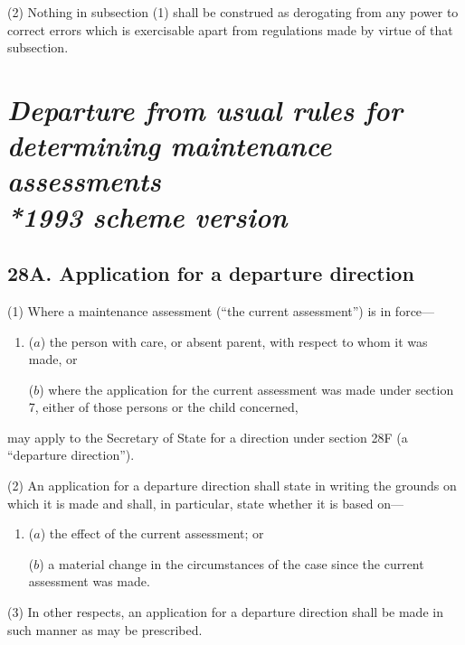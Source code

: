 \documentclass[12pt,a4paper]{article}
\begin{document}
(2) Nothing in subsection (1) shall be construed as derogating from any power to correct errors 
which is exercisable apart from regulations made by virtue of that subsection.


\section[\itshape Departure from usual rules for determining maintenance assessments --- \emph{1993 scheme version}]{\itshape Departure from usual rules for determining maintenance assessments\\*\emph{1993 scheme version}}

\subsection{28A. Application for a departure direction}

(1) Where a maintenance assessment (“the current assessment”) is in force—
\begin{enumerate}\item[]
($a$) the person with care, or absent parent, with respect to whom it was made, or

($b$) where the application for the current assessment was made under section 7, either of those persons or the child concerned,
\end{enumerate}
may apply to the Secretary of State for a direction under section 28F (a “departure direction”).

(2) An application for a departure direction shall state in writing the grounds on which it is made and shall, in particular, state whether it is based on—
\begin{enumerate}\item[]
($a$) the effect of the current assessment; or

($b$) a material change in the circumstances of the case since the current assessment was made.
\end{enumerate}

(3) In other respects, an application for a departure direction shall be made in such manner as may be prescribed.
\end{document}
